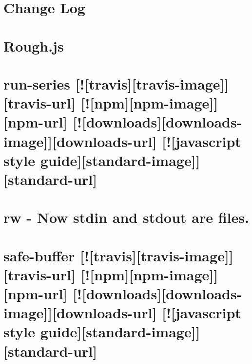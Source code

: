 \documentclass[twoside]{book}
\newcommand{\+}{\discretionary{\mbox{\scriptsize$\hookleftarrow$}}{}{}}
\begin{document}
\chapter{Change Log}
\label{md_dsmacc_examples_DRmerge_node_modules_roughjs_CHANGELOG}

\chapter{Rough.\+js}
\label{md_dsmacc_examples_DRmerge_node_modules_roughjs_README}

\chapter{run-\/series \mbox{[}!\mbox{[}travis\mbox{]}\mbox{[}travis-\/image\mbox{]}\mbox{]}\mbox{[}travis-\/url\mbox{]} \mbox{[}!\mbox{[}npm\mbox{]}\mbox{[}npm-\/image\mbox{]}\mbox{]}\mbox{[}npm-\/url\mbox{]} \mbox{[}!\mbox{[}downloads\mbox{]}\mbox{[}downloads-\/image\mbox{]}\mbox{]}\mbox{[}downloads-\/url\mbox{]} \mbox{[}!\mbox{[}javascript style guide\mbox{]}\mbox{[}standard-\/image\mbox{]}\mbox{]}\mbox{[}standard-\/url\mbox{]}}
\label{md_dsmacc_examples_DRmerge_node_modules_run-series_README}

\chapter{rw -\/ Now stdin and stdout are files.}
\label{md_dsmacc_examples_DRmerge_node_modules_rw_README}

\chapter{safe-\/buffer \mbox{[}!\mbox{[}travis\mbox{]}\mbox{[}travis-\/image\mbox{]}\mbox{]}\mbox{[}travis-\/url\mbox{]} \mbox{[}!\mbox{[}npm\mbox{]}\mbox{[}npm-\/image\mbox{]}\mbox{]}\mbox{[}npm-\/url\mbox{]} \mbox{[}!\mbox{[}downloads\mbox{]}\mbox{[}downloads-\/image\mbox{]}\mbox{]}\mbox{[}downloads-\/url\mbox{]} \mbox{[}!\mbox{[}javascript style guide\mbox{]}\mbox{[}standard-\/image\mbox{]}\mbox{]}\mbox{[}standard-\/url\mbox{]}}
\label{md_dsmacc_examples_DRmerge_node_modules_safe-buffer_README}

\end{document}
